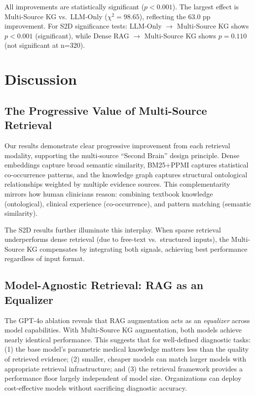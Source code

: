 \documentclass[preprint,12pt]{elsarticle}
\begin{document}
All improvements are statistically significant ($p < 0.001$). The largest effect is Multi-Source KG vs.\ LLM-Only ($\chi^2 = 98.65$), reflecting the 63.0 pp improvement. For S2D significance tests: LLM-Only $\rightarrow$ Multi-Source KG shows $p<0.001$ (significant), while Dense RAG $\rightarrow$ Multi-Source KG shows $p=0.110$ (not significant at n=320).

\section{Discussion}
\label{sec:discussion}

\subsection{The Progressive Value of Multi-Source Retrieval}

Our results demonstrate clear progressive improvement from each retrieval modality, supporting the multi-source ``Second Brain'' design principle. Dense embeddings capture broad semantic similarity, BM25+PPMI captures statistical co-occurrence patterns, and the knowledge graph captures structural ontological relationships weighted by multiple evidence sources. This complementarity mirrors how human clinicians reason: combining textbook knowledge (ontological), clinical experience (co-occurrence), and pattern matching (semantic similarity).

The S2D results further illuminate this interplay. When sparse retrieval underperforms dense retrieval (due to free-text vs.\ structured inputs), the Multi-Source KG compensates by integrating both signals, achieving best performance regardless of input format.

\subsection{Model-Agnostic Retrieval: RAG as an Equalizer}

The GPT-4o ablation reveals that RAG augmentation acts as an \emph{equalizer} across model capabilities. With Multi-Source KG augmentation, both models achieve nearly identical performance. This suggests that for well-defined diagnostic tasks: (1) the base model's parametric medical knowledge matters less than the quality of retrieved evidence; (2) smaller, cheaper models can match larger models with appropriate retrieval infrastructure; and (3) the retrieval framework provides a performance floor largely independent of model size. Organizations can deploy cost-effective models without sacrificing diagnostic accuracy.
\end{document}
